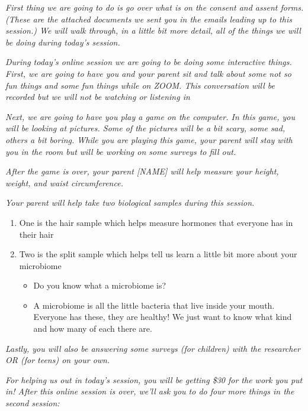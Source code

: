 \documentclass[
]{book}
\begin{document}
\emph{First thing we are going to do is go over what is on the consent and assent forms. (These are the attached documents we sent you in the emails leading up to this session.) We will walk through, in a little bit more detail, all of the things we will be doing during today's session.}

\emph{During today's online session we are going to be doing some interactive things. First, we are going to have you and your parent sit and talk about some not so fun things and some fun things while on ZOOM. This conversation will be recorded but we will not be watching or listening in}

\emph{Next, we are going to have you play a game on the computer. In this game, you will be looking at pictures. Some of the pictures will be a bit scary, some sad, others a bit boring. While you are playing this game, your parent will stay with you in the room but will be working on some surveys to fill out.}

\emph{After the game is over, your parent {[}NAME{]} will help measure your height, weight, and waist circumference.}

\emph{Your parent will help take two biological samples during this session.}

\begin{enumerate}
\def\labelenumi{\arabic{enumi}.}
\item
  One is the hair sample which helps measure hormones that everyone has in their hair
\item
  Two is the split sample which helps tell us learn a little bit more about your microbiome

  \begin{itemize}
  \item
    Do you know what a microbiome is?
  \item
    A microbiome is all the little bacteria that live inside your mouth. Everyone has these, they are healthy! We just want to know what kind and how many of each there are.
  \end{itemize}
\end{enumerate}

\emph{Lastly, you will also be answering some surveys (for children) with the researcher OR (for teens) on your own.}

\emph{For helping us out in today's session, you will be getting \$30 for the work you put in! After this online session is over, we'll ask you to do four more things in the second session:}
\end{document}
